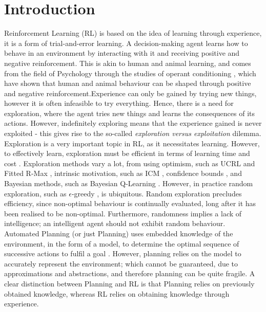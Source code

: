 
\chapter{Introduction}

\label{chapter1}

Reinforcement Learning (RL) \cite{Sutton1998} is based on the idea of learning through experience, it is a form of trial-and-error learning. A decision-making agent learns how to behave in an environment by interacting with it and receiving positive and negative reinforcement. This is akin to human and animal learning, and comes from the field of Psychology through the studies of operant conditioning \cite{nla.cat-vn2770732}, which have shown that human and animal behaviour can be shaped through positive and negative reinforcement.Experience can only be gained by trying new things, however it is often infeasible to try everything. Hence, there is a need for exploration, where the agent tries new things and learns the consequences of its actions. However, indefinitely exploring means that the experience gained is never exploited - this gives rise to the so-called \textit{exploration versus exploitation} dilemma.
\\Exploration is a very important topic in RL, as it necessitates learning. However, to effectively learn, exploration must be efficient in terms of learning time and cost \cite{Thrun-1992-15850}.
Exploration methods vary a lot, from using optimism, such as UCRL \cite{NIPS2006_c1b70d96} and Fitted R-Max \cite{SARA07-jong}, intrinsic motivation, such as ICM \cite{DBLP:journals/corr/PathakAED17}, confidence bounds \cite{10.5555/911176}, and Bayesian methods, such as Bayesian Q-Learning \cite{10.5555/944919.944941}. However, in practice random exploration, such as $\epsilon$-greedy \cite{Watkins:1989, conf/nips/Sutton95}, is ubiquitous. Random exploration precludes efficiency, since non-optimal behaviour is continually evaluated, long after it has been realised to be non-optimal. Furthermore, randomness implies a lack of intelligence; an intelligent agent should not exhibit random behaviour.
\\Automated Planning (or just Planning) \cite{DBLP:books/aw/RN2020, Lav06} uses embedded knowledge of the environment, in the form of a model, to determine the optimal sequence of successive actions to fulfil a goal . However, planning relies on the model to accurately represent the environment; which cannot be guaranteed, due to approximations and abstractions, and therefore planning can be quite fragile. A clear distinction between Planning and RL is that Planning relies on previously obtained knowledge, whereas RL relies on obtaining knowledge through experience.
